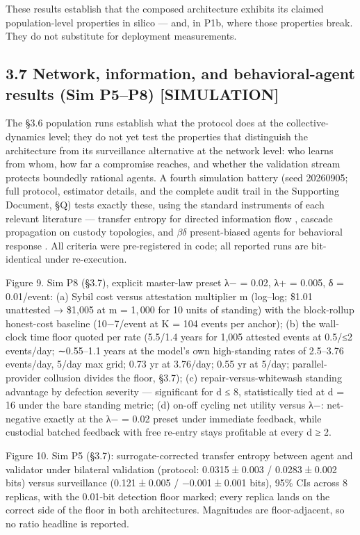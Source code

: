 \documentclass[
]{article}
\begin{document}
These results establish that the composed architecture exhibits its
claimed population-level properties in silico --- and, in P1b, where
those properties break. They do not substitute for deployment
measurements.

\subsection{3.7 Network, information, and behavioral-agent results (Sim
P5--P8)
{[}SIMULATION{]}}\label{network-information-and-behavioral-agent-results-sim-p5p8-simulation}

The §3.6 population runs establish what the protocol does at the
collective-dynamics level; they do not yet test the properties that
distinguish the architecture from its surveillance alternative at the
network level: who learns from whom, how far a compromise reaches, and
whether the validation stream protects boundedly rational agents. A
fourth simulation battery (seed 20260905; full protocol, estimator
details, and the complete audit trail in the Supporting Document, §Q)
tests exactly these, using the standard instruments of each relevant
literature --- transfer entropy for directed information flow , cascade
propagation on custody topologies, and \(\beta\delta\) present-biased
agents for behavioral response . All criteria were pre-registered in
code; all reported runs are bit-identical under re-execution.

Figure 9. Sim P8 (§3.7), explicit master-law preset {λ− = 0.02},
{λ+ = 0.005}, {δ = 0.01}/event: (a) Sybil cost versus attestation
multiplier {m} (log--log; \$1.01 unattested {→} \$1{,}005 at
{m = 1, 000} for 10 units of standing) with the block-rollup honest-cost
baseline ({10−7}/event at {K = 104} events per anchor); (b) the
wall-clock time floor quoted per rate (5.5/1.4 years for 1{,}005
attested events at 0.5/{≤}2 events/day; {∼}0.55--1.1 years at the
model's own high-standing rates of 2.5--3.76 events/day, 5/day max grid;
0.73 yr at 3.76/day; 0.55 yr at 5/day; parallel-provider collusion
divides the floor, §3.7); (c) repair-versus-whitewash standing advantage
by defection severity --- significant for {d ≤ 8}, statistically tied at
{d = 16} under the bare standing metric; (d) on-off cycling net utility
versus {λ−}: net-negative exactly at the {λ− = 0.02} preset under
immediate feedback, while custodial batched feedback with free re-entry
stays profitable at every {d ≥ 2}.

Figure 10. Sim P5 (§3.7): surrogate-corrected transfer entropy between
agent and validator under bilateral validation (protocol:
{0.0315 ± 0.003} / {0.0283 ± 0.002} bits) versus surveillance
({0.121 ± 0.005} / {−0.001 ± 0.001} bits), 95\% CIs across 8 replicas,
with the 0.01-bit detection floor marked; every replica lands on the
correct side of the floor in both architectures. Magnitudes are
floor-adjacent, so no ratio headline is reported.
\end{document}
